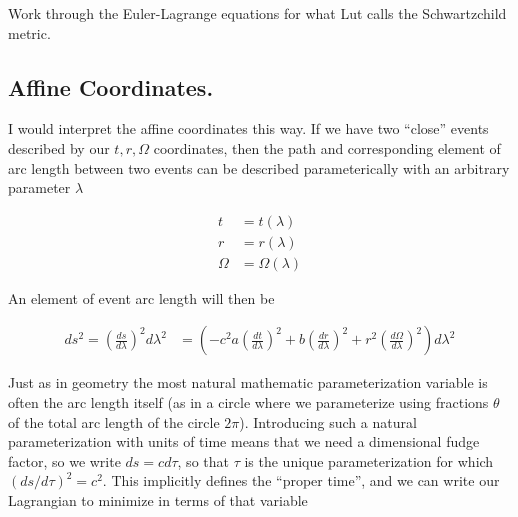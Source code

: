 \documentclass{article}      %
\newcommand{\PD}[2]{\frac{\partial {#2}}{\partial {#1}}}
\newcommand{\CC}[0]{c^2}
\newcommand{\adot}[0]{\dot{a}}
\newcommand{\rdot}[0]{\dot{r}}
\begin{document}
Work through the Euler-Lagrange equations for what Lut calls the 
Schwartzchild metric.

\subsection{ Affine Coordinates. }


I would interpret the affine coordinates this way.  If we have two ``close'' events described by our $t,r,\Omega$ coordinates, then the path and corresponding
element of arc length between two events can be described parameterically
with an arbitrary parameter $\lambda$

\begin{align*}
t &= t(\lambda) \\
r &= r(\lambda) \\
\Omega &= \Omega(\lambda)
\end{align*}

An element of event arc length will then be

\begin{align*}
ds^2 = \left(\frac{ds}{d\lambda}\right)^2 {d\lambda}^2
&=
\left( -\CC a \left(\frac{dt}{d\lambda}\right)^2 + {b} \left(\frac{dr}{d\lambda}\right)^2 + r^2\left(\frac{d\Omega}{d\lambda}\right)^2 \right) {d\lambda}^2
\end{align*}

Just as in geometry the most natural mathematic parameterization variable is often the arc length itself (as in a circle where we parameterize using fractions $\theta$ of the total arc length of the circle $2\pi$).
Introducing such a natural parameterization with units of time means that we need a dimensional fudge factor, so we write $ds = c d\tau$, so that $\tau$ is the unique parameterization for which $(ds/d\tau)^2 = c^2$.
This implicitly defines the ``proper time'', and we can write our Lagrangian to minimize in terms of that variable
\end{document}
